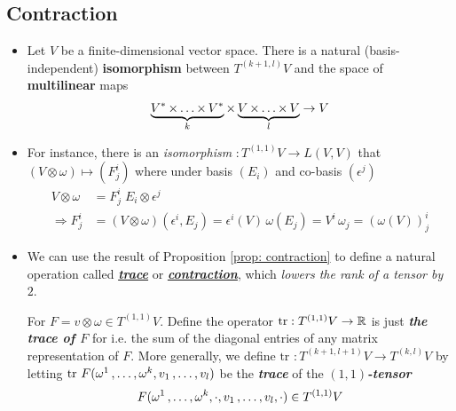 \documentclass[11pt]{article}
\begin{document}
\subsection{Contraction}
\begin{itemize}
\item \begin{proposition} \label{prop: contraction}
Let $V$ be a finite-dimensional vector space. There is a natural (basis-independent) \textbf{isomorphism} between $T^{(k+1, l)}V$ and the space of \textbf{multilinear}
maps
\begin{align*}
\underbrace{V^{*} \,{\times}\ldots{\times}\, V^{*}}_{k} \times \underbrace{V \,{\times}\ldots{\times}\, V}_{l} \rightarrow V
\end{align*}
\end{proposition}

\item \begin{remark}
For instance, there is an \emph{isomorphism} $: T^{(1,1)}V \rightarrow L(V, V)$ that $(V \otimes \omega) \mapsto (F_{j}^{i})$
where under basis $(E_i)$ and co-basis $(\epsilon^j)$
 \begin{align*}
 V \otimes \omega &= F_{j}^{i}\; E_i \otimes \epsilon^j \\
 \Rightarrow F_{j}^{i} &= (V \otimes \omega)(\epsilon^i, E_j) = \epsilon^i(V)\,\omega(E_j) =V^i\, \omega_j = (\omega(V))_{j}^{i}
 \end{align*}
 \end{remark}


\item \begin{definition}
We can use the result of Proposition \ref{prop: contraction} to define a natural operation called \underline{\emph{\textbf{trace}}} or \underline{\emph{\textbf{contraction}}}, which \emph{lowers the rank of a tensor by $2$}. 

For $F = v\otimes \omega \in T^{(1,1)}V$.  Define the operator $\text{tr}: T^{(1,1)}V  \rightarrow {\mathbb R}$ is just \emph{\textbf{the trace of $F$}} for  i.e. the sum of the diagonal entries of any matrix representation of $F$. More generally, we define $\text{tr }: T^{(k+1, l+1)}V  \rightarrow T^{(k,l)}V$ by letting $\text{tr }F(\omega^1 \,{,}\ldots{,}\, \omega^k, v_1 \,{,}\ldots{,}\, v_l)$ be the \emph{\textbf{trace}} of the \emph{\textbf{$(1,1)$-tensor}}
\begin{align*}
F(\omega^1 \,{,}\ldots{,}\, \omega^k, \cdot, v_1 \,{,}\ldots{,}\, v_l, \cdot)  \in T^{(1,1)}V
\end{align*}


\end{definition}
\end{itemize}
\end{document}
